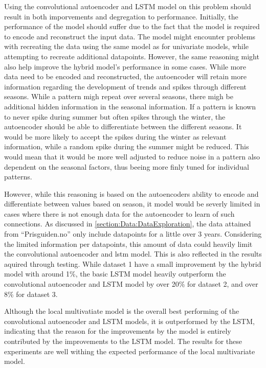 Using the convolutional autoencoder and LSTM model on this problem should result in both imporvements and degregation to performance.
Initially, the performance of the model should suffer due to the fact that the model is required to encode and reconstruct the
input data.
The model might encounter problems with recreating the data using the same model as for univariate models,
while attempting to recreate additional datapoints.
However, the same reasoning might also help improve the hybrid model's performance in some cases.
While more data need to be encoded and reconstructed, the autoencoder will retain more information
regarding the development of trends and spikes through different seasons.
While a pattern migh repeat over several seasons, there migh be additional hidden information in the seasonal information.
If a pattern is known to never spike during summer but often spikes through the winter,
the autoencoder should be able to differentiate between the different seasons.
It would be more likely to accept the spikes during the winter as relevant information, while a random spike during the summer might be reduced.
This would mean that it would be more well adjusted to reduce noise in a pattern also dependent on the seasonal factors,
thus beeing more finly tuned for individual patterns.

However, while this reasoning is based on the autoencoders ability to encode and differentiate between values based on season,
it model would be severly limited in cases where there is not enough data for the autoencoder to learn of such connections.
As discussed in \cref{section:Data:DataExploration}, the data attained from ``Prisguiden.no'' only include datapoints
for a little over 3 years.
Considering the limited information per datapoints, this amount of data could heavily limit the convolutional autoencoder and lstm model.
This is also reflected in the results aquired through testing.
While dataset 1 have a small improvement by the hybrid model with around 1\%,
the basic LSTM model heavily outperform the convolutional autoencoder and LSTM model by over 20\% for dataset 2, and over 8\% for dataset 3.

Although the local multivatiate model is the overall best performing of the convolutional autoencoder and LSTM models,
it is outperformed by the LSTM, indicating that the reason for the improvements by the model
is entirely contributed by the improvements to the LSTM model.
The results for these experiments are well withing the expected performance of the local multivariate model.





